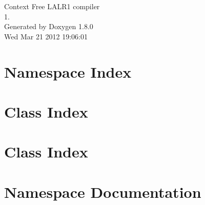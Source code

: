 \documentclass{book}
\begin{document}
\hypersetup{pageanchor=false,citecolor=blue}
\begin{titlepage}
\vspace*{7cm}
\begin{center}
{\Large Context Free L\-A\-L\-R1 compiler \\[1ex]\large 1. }\\
\vspace*{1cm}
{\large Generated by Doxygen 1.8.0}\\
\vspace*{0.5cm}
{\small Wed Mar 21 2012 19:06:01}\\
\end{center}
\end{titlepage}
\clearemptydoublepage
{}
\tableofcontents
\clearemptydoublepage
{}
\hypersetup{pageanchor=true,citecolor=blue}
\chapter{Namespace Index}

\chapter{Class Index}

\chapter{Class Index}

\chapter{Namespace Documentation}




\end{document}
